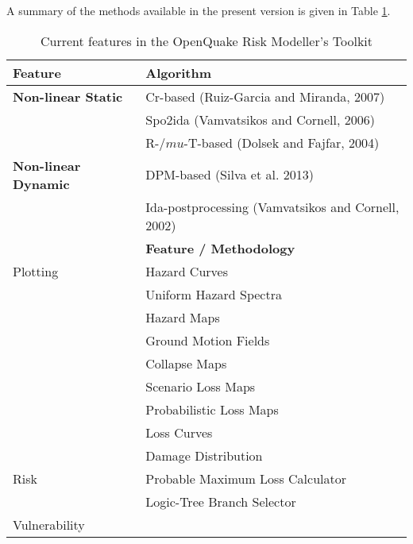 A summary of the methods available in the present version is given in Table \ref{tab:current_features}.
\begin{table}[!htbp]
\centering
\begin{tabular}{|l|l|} \hline
Feature & Algorithm\\ \hline
\textbf{Non-linear Static} & Cr-based (Ruiz-Garcia and Miranda, 2007)\\
    & Spo2ida (Vamvatsikos and Cornell, 2006) \\
    & R-$/mu$-T-based (Dolsek and Fajfar, 2004) \\ \hline
 \textbf{Non-linear Dynamic} & DPM-based (Silva et al. 2013)\\
  & Ida-postprocessing (Vamvatsikos and Cornell, 2002) \\ \hline

\begin{table}[!htbp]
\centering
\begin{tabular}{|c|c|} \hline
\textbf{Module} & \textbf{Feature / Methodology} \\ \hline
Plotting & Hazard Curves \\
         & Uniform Hazard Spectra \\
         & Hazard Maps \\
         & Ground Motion Fields \\
         & Collapse Maps \\
         & Scenario Loss Maps \\
         & Probabilistic Loss Maps \\
         & Loss Curves \\
         & Damage Distribution \\ \hline
Risk & Probable Maximum Loss Calculator \\
	 & Logic-Tree Branch Selector \\ \hline
Vulnerability & 
\end{tabular}
\caption{Current features in the OpenQuake Risk Modeller's Toolkit}
\label{tab:current_features}

\end{table}